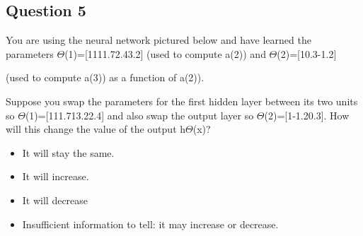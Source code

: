 \documentclass[11pt]{article} %
\begin{document}
\subsection*{Question 5}

You are using the neural network pictured below and have learned the parameters 
$\Theta$(1)=[1111.72.43.2] 
(used to compute a(2)) and $\Theta$(2)=[10.3-1.2] 

(used to compute a(3)) as a function of a(2)). 

Suppose you swap the parameters for the first hidden layer between its two units so $\Theta$(1)=[111.713.22.4] and also swap the output layer so $\Theta$(2)=[1-1.20.3]. How will this change the value of the output h$\Theta$(x)?

\begin{itemize}
	
	\item It will stay the same.
	
	\item It will increase.
	
	\item It will decrease
	
	\item Insufficient information to tell: it may increase or decrease.
	
\end{itemize}

	
\end{document}
